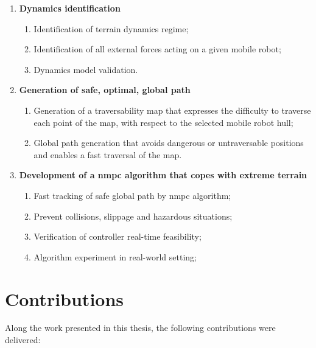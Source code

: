 \begin{enumerate}
\item \textbf{Dynamics identification}
	\begin{enumerate}
		\item Identification of terrain dynamics regime;
		\item Identification of all external forces acting on a given mobile robot;
		\item Dynamics model validation.
	\end{enumerate}
\item \textbf{Generation of safe, optimal, global path}
	\begin{enumerate}
		\item Generation of a traversability map that expresses the difficulty to traverse each point of the map, with respect to the selected mobile robot hull;
		\item Global path generation that avoids dangerous or untraversable positions and enables a fast traversal of the map.
	\end{enumerate}
\item \textbf{Development of a \acrlong{nmpc} algorithm that copes with extreme terrain}
	\begin{enumerate}
		\item Fast tracking of safe global path by \acrshort{nmpc} algorithm;
		\item Prevent collisions, slippage and hazardous situations;
		\item Verification of controller real-time feasibility;
		\item Algorithm experiment in real-world setting;
	\end{enumerate}
\end{enumerate}

\section{Contributions}
\label{section:contributions}

Along the work presented in this thesis, the following contributions were delivered:

